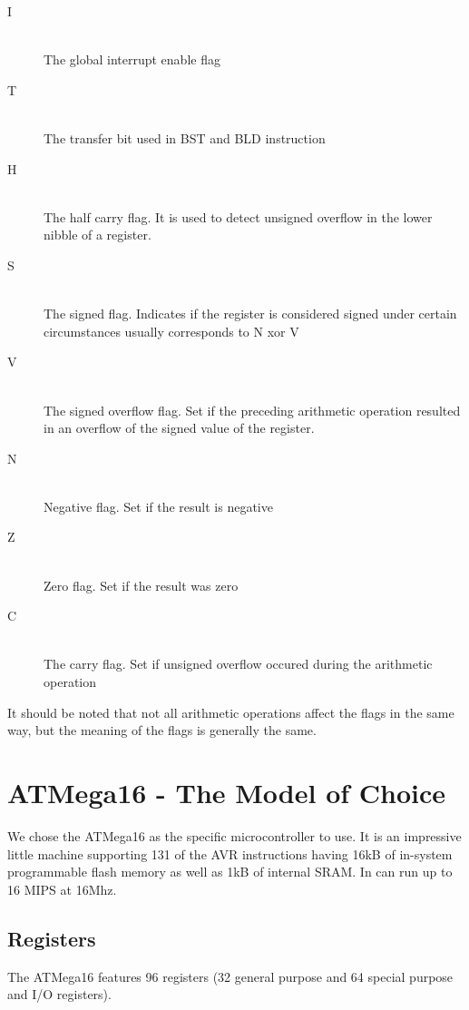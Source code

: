 \begin{description}
\item[I] \hfill \\
The global interrupt enable flag
\item[T] \hfill \\ 
The transfer bit used in BST and BLD instruction %
\item[H] \hfill \\ 
The half carry flag. It is used to detect unsigned overflow in the 
lower nibble of a register.
\item[S] \hfill \\ 
The signed flag. Indicates if the register is considered signed under 
certain circumstances usually corresponds to N xor V
\item[V] \hfill \\
The signed overflow flag. Set if the preceding arithmetic operation
resulted in an overflow of the signed value of the register.
\item[N] \hfill \\ 
Negative flag. Set if the result is negative
\item[Z] \hfill \\ 
Zero flag. Set if the result was zero
\item[C] \hfill \\ 
The carry flag. Set if unsigned overflow occured during the arithmetic 
operation
\end{description}

It should be noted that not all arithmetic operations affect the flags in the same
way, but the meaning of the flags is generally the same.

\section{ATMega16 - The Model of Choice}

We chose the ATMega16 as the specific microcontroller to use. It is an 
impressive little machine supporting 131 of the AVR instructions
having 16kB of in-system programmable flash memory as well as 1kB of 
internal SRAM. In can run up to 16 MIPS at 16Mhz.

\subsection{Registers}

The ATMega16 features 96 registers (32 general purpose and 64 special 
purpose and I/O registers).

